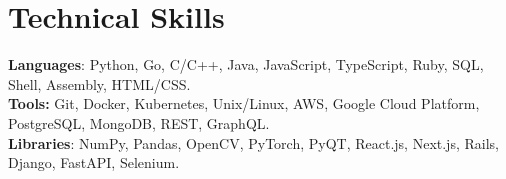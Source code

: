 
\section{Technical Skills}
    \begin{itemize}[leftmargin=0.15in, label={}]
	\small{\item{
		\textbf{Languages}{: 
                Python,
                Go,
                C/C++,
                Java,
                JavaScript,
                TypeScript,
                Ruby,
                SQL,
                Shell,
                Assembly,
                HTML/CSS.
            } \\
            \textbf{Tools:}{
                Git,
                Docker,
                Kubernetes,
                Unix/Linux,
                AWS,
                Google Cloud Platform,
                PostgreSQL,
                MongoDB,
                REST,
                GraphQL.
            } \\
            \textbf{Libraries}{:
                NumPy,
                Pandas,
                OpenCV,
                PyTorch,
                PyQT,
                React.js,
                Next.js,
                Rails,
                Django,
                FastAPI,
                Selenium.
            } \\
	}}
    \end{itemize}
    \vspace{-13pt}  %
